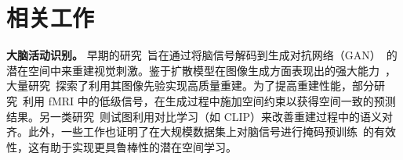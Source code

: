 ﻿%
\section{相关工作}

\noindent \textbf{大脑活动识别。}
早期的研究~\cite{vanrullen2019reconstructing,dado2022hyperrealistic,shen2019deep,seeliger2018generative,NEURIPS2022_bee5125b,gu2022decoding,ferrante2022semantic}旨在通过将脑信号解码到生成对抗网络（GAN）~\cite{goodfellow2020generative}的潜在空间中来重建视觉刺激。鉴于扩散模型在图像生成方面表现出的强大能力~\cite{rombach2022high,ho2020denoising}，大量研究~\cite{takagi2023high,chen2023seeing,scotti2023reconstructing,lu2023minddiffuser,bai2023dreamdiffusion,lan2023seeing,zeng2023controllable,li2024neuraldiffuser,fang2024alleviating,li2024visual}探索了利用其图像先验实现高质量重建。为了提高重建性能，部分研究~\cite{zeng2023controllable,lu2023minddiffuser}利用 fMRI 中的低级信号，在生成过程中施加空间约束以获得空间一致的预测结果。另一类研究~\cite{liu2023brainclip}则试图利用对比学习（如 CLIP）来改善重建过程中的语义对齐。此外，一些工作也证明了在大规模数据集上对脑信号进行掩码预训练~\cite{he2022masked,bai2023dreamdiffusion}的有效性，这有助于实现更具鲁棒性的潜在空间学习。

